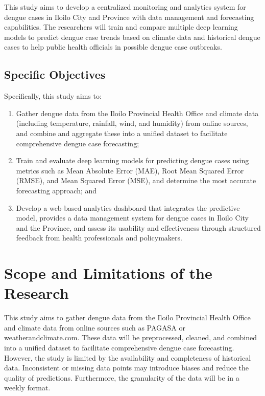 This study aims to develop a centralized monitoring and analytics system for dengue cases in Iloilo City and Province with data management and forecasting capabilities. 
The researchers will train and compare multiple deep learning models to predict dengue case trends based on climate data and 
historical dengue cases to help public health officials in possible dengue case outbreaks.


\subsection{Specific Objectives}
\label{sec:specificobjectives}

%
%

Specifically, this study aims to:


\begin{enumerate}
	\item Gather dengue data from the Iloilo Provincial Health Office and climate data (including temperature, rainfall, wind, and humidity) from online sources, and combine and aggregate these into a unified dataset to facilitate comprehensive dengue case forecasting;
	\item Train and evaluate deep learning models for predicting dengue cases using metrics such as Mean Absolute Error (MAE), Root Mean Squared Error (RMSE), and Mean Squared Error (MSE), and determine the most accurate forecasting approach; and
	\item Develop a web-based analytics dashboard that integrates the predictive model, provides a data management system for dengue cases in Iloilo City and the Province, and assess its usability and effectiveness through structured feedback from health professionals and policymakers.
\end{enumerate}

\section{Scope and Limitations of the Research}
\label{sec:scopelimitations}

This study aims to gather dengue data from the Iloilo Provincial Health Office and climate data from online sources such as PAGASA or weatherandclimate.com. These data will be preprocessed, cleaned, and combined into a unified dataset to facilitate comprehensive dengue case forecasting. However, the study is limited by the availability and completeness of historical data. Inconsistent or missing data points may introduce biases and reduce the quality of predictions. Furthermore, the granularity of the data will be in a weekly format.


